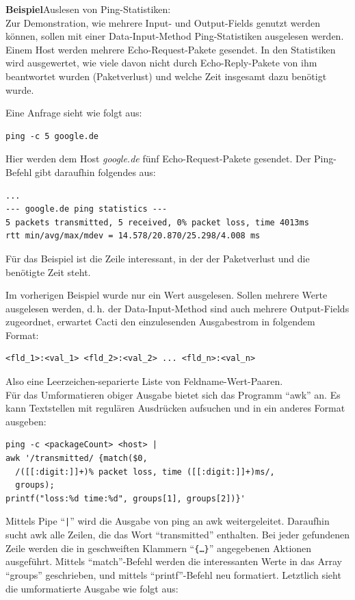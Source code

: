 \documentclass[12pt,ngerman,toc=listofnumbered,toc=bibliographynumbered,toc=index,headsepline=true]{scrbook}
\begin{document}
\textbf{Beispiel}\quad Auslesen von Ping-Statistiken:\\[1ex]
Zur Demonstration, wie mehrere Input- und Output-Fields genutzt werden können,
sollen mit einer Data-Input-Method Ping-Statistiken ausgelesen werden. Einem
Host werden mehrere Echo-Request-Pakete gesendet. In den Statistiken wird
ausgewertet, wie viele davon nicht durch Echo-Reply-Pakete von ihm beantwortet
wurden (Paketverlust) und welche Zeit insgesamt dazu benötigt
wurde.

Eine Anfrage sieht wie folgt aus:

\begin{lstlisting}[xleftmargin=20pt]
ping -c 5 google.de
\end{lstlisting}

Hier werden dem Host \textit{google.de} fünf Echo-Request-Pakete gesendet. Der
Ping-Befehl gibt daraufhin folgendes aus:

\begin{lstlisting}[xleftmargin=20pt]
...
--- google.de ping statistics ---
5 packets transmitted, 5 received, 0% packet loss, time 4013ms
rtt min/avg/max/mdev = 14.578/20.870/25.298/4.008 ms
\end{lstlisting}

Für das Beispiel ist die Zeile interessant, in der der Paketverlust und die
benötigte Zeit steht.

Im vorherigen Beispiel wurde nur ein Wert ausgelesen. Sollen mehrere
Werte ausgelesen werden, d.\,h. der Data-Input-Method sind auch mehrere
Output-Fields zugeordnet, erwartet Cacti den einzulesenden Ausgabestrom in
folgendem Format:
\begin{lstlisting}[xleftmargin=20pt]
<fld_1>:<val_1> <fld_2>:<val_2> ... <fld_n>:<val_n>
\end{lstlisting}
Also eine Leerzeichen-separierte Liste von Feldname-Wert-Paaren.\\
Für das Umformatieren obiger Ausgabe bietet sich das Programm \enquote{awk} an.
Es kann Textstellen mit regulären Ausdrücken aufsuchen und in ein anderes Format
ausgeben:

\begin{lstlisting}[xleftmargin=20pt]
ping -c <packageCount> <host> |
awk '/transmitted/ {match($0,
  /([[:digit:]]+)% packet loss, time ([[:digit:]]+)ms/,
  groups);
printf("loss:%d time:%d", groups[1], groups[2])}'
\end{lstlisting}

Mittels Pipe \enquote{\texttt{|}} wird die Ausgabe von ping an awk
weitergeleitet. Daraufhin sucht awk alle Zeilen, die das Wort
\enquote{transmitted} enthalten. Bei jeder gefundenen Zeile werden die in
geschweiften Klammern \enquote{\texttt{\{\ldots\}}} angegebenen Aktionen
ausgeführt. Mittels \enquote{match}-Befehl werden die interessanten Werte in das
Array \enquote{groups} geschrieben, und mittels \enquote{printf}-Befehl neu
formatiert. Letztlich sieht die umformatierte Ausgabe wie folgt aus:
\end{document}
